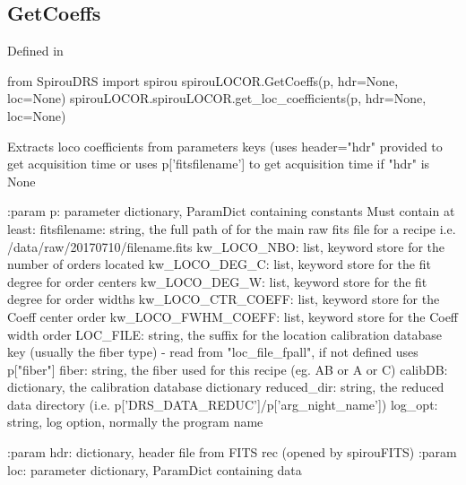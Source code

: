 \begin{minipage}{\textwidth}
\subsection{GetCoeffs}

Defined in \spirouLOCOR{}

\begin{pythonbox}
from SpirouDRS import spirou
spirouLOCOR.GetCoeffs(p, hdr=None, loc=None)
spirouLOCOR.spirouLOCOR.get_loc_coefficients(p, hdr=None, loc=None)
\end{pythonbox}

\begin{pythondocstring}
Extracts loco coefficients from parameters keys (uses header="hdr" provided
to get acquisition time or uses p['fitsfilename'] to get acquisition time if
"hdr" is None

:param p: parameter dictionary, ParamDict containing constants
    Must contain at least:
            fitsfilename: string, the full path of for the main raw fits
                          file for a recipe
                          i.e. /data/raw/20170710/filename.fits
            kw_LOCO_NBO: list, keyword store for the number of orders
                         located
            kw_LOCO_DEG_C: list, keyword store for the fit degree for
                           order centers
            kw_LOCO_DEG_W: list, keyword store for the fit degree for
                           order widths
            kw_LOCO_CTR_COEFF: list, keyword store for the Coeff center
                               order
            kw_LOCO_FWHM_COEFF: list, keyword store for the Coeff width
                                order
            LOC_FILE: string, the suffix for the location calibration
                      database key (usually the fiber type)
                         - read from "loc_file_fpall", if not defined
                           uses p["fiber"]
            fiber: string, the fiber used for this recipe (eg. AB or A or C)
            calibDB: dictionary, the calibration database dictionary
            reduced_dir: string, the reduced data directory
                         (i.e. p['DRS_DATA_REDUC']/p['arg_night_name'])
            log_opt: string, log option, normally the program name

:param hdr: dictionary, header file from FITS rec (opened by spirouFITS)
:param loc: parameter dictionary, ParamDict containing data


\end{pythondocstring}
\end{minipage}

